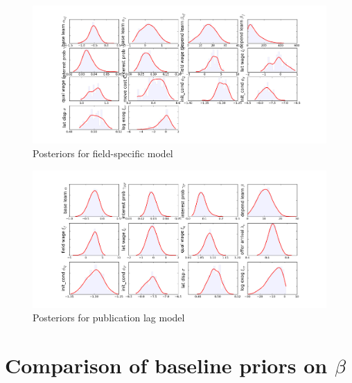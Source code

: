 \begin{figure}[h!]
    \includegraphics{pics/params_dists_split.png}
    \caption{Posteriors for field-specific model}
\end{figure}

\begin{figure}[h!]
    \includegraphics{pics/params_dists_lag.png}
    \caption{Posteriors for publication lag model}
\end{figure}

\clearpage 

\section{Comparison of baseline priors on $\beta$} 
\label{sec:prior_comp}

